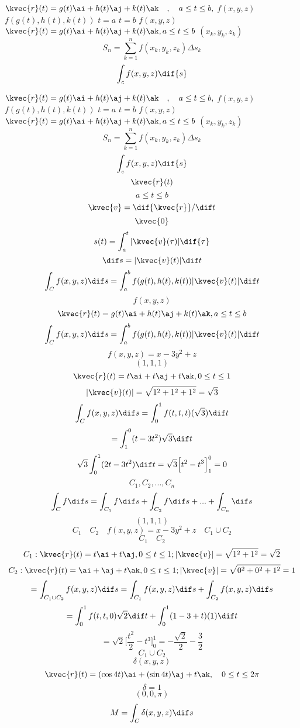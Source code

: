 

\( \kvec{r}(t)=g(t)\ai + h(t)\aj +k(t)\ak \quad , \quad a\le t \le b,            \)  
\(   f(x,y,z)          \)  
\(   f(g(t),h(t),k(t))          \)  
\(     t=a        \)  
\(   t=b          \)  
\(     f(x,y,z)        \)  
\(   \kvec{r}(t)=g(t)\ai + h(t)\aj+k(t)\ak, a\le t \le b          \)  
\(   (x_{k}, y_{k} , z_{k}  )                 \)  
 \[   S_{n}=\sum^{n}_{k=1}f(x_{k}, y_{k} , z_{k}  ) \Delta s_{k}          \]
   \[   \int_{c}f(x,y,z)\dif{s}           \]

\(             \)             \[              \]
\( \kvec{r}(t)=g(t)\ai + h(t)\aj +k(t)\ak \quad , \quad a\le t \le b,            \)  
\(   f(x,y,z)          \)  
\(   f(g(t),h(t),k(t))          \)  
\(     t=a        \)  
\(   t=b          \)  
\(     f(x,y,z)        \)  
\(   \kvec{r}(t)=g(t)\ai + h(t)\aj+k(t)\ak, a\le t \le b          \)  
\(   (x_{k}, y_{k} , z_{k}  )                 \)  
 \[   S_{n}=\sum^{n}_{k=1}f(x_{k}, y_{k} , z_{k}  ) \Delta s_{k}          \]
   \[   \int_{c}f(x,y,z)\dif{s}           \]
\[\kvec{r}(t)\]
\[a\le t\le b\]
\[\kvec{v} = \dif{\kvec{r}}/ \dif t\]
\[\kvec{0}\]
\[s(t) = \int_{a}^{t}|\kvec{v}(\tau )| \dif{\tau }\]
\[\dif s = |\kvec{v}(t)|\dif t\]
\[\int_{C}f(x,y,z)\dif s =\int_{a}^{b}f(g(t),h(t),k(t))|\kvec{v}(t)|\dif t\]
\[f(x,y,z)\]
\[\kvec{r}(t)=g(t)\ai + h(t)\aj + k(t)\ak, a\le t\le b\]
\[\int_{C}f(x,y,z)\dif s = \int_{a}^{b}f(g(t),h(t),k(t))|\kvec{v}(t)|\dif t\]
\[f(x,y,z)= x-3y^2 + z\]
\[(1,1,1)\]
\[\kvec{r}(t)=t\ai + t\aj + t\ak, 0\le t\le 1\]
\[|\kvec{v}(t)| = \sqrt{1^2 + 1^2 + 1^2} = \sqrt{3}\]
\[\int_{C}f(x,y,z)\dif s = \int_{0}^{1}f(t,t,t)(\sqrt{3})\dif t\]
\[=\int_{1}^{0}(t-3t^2)\sqrt{3}\dif t\]
\[\sqrt{3}\int_{0}^{1}(2t-3t^2)\dif t = \sqrt{3}\Big[t^2 -t^3\Big]_{1}^{0} =0\]
\[C_1,C_2,...,C_n\]
\[\int_{C}f\dif s = \int_{C_1}f\dif s + \int_{C_2}f\dif s +...+\int_{C_n}\dif s\]
\[(1,1,1)\]
\[C_1\quad C_2\quad f(x,y,z)=x-3y^2 +z\quad C_1\cup C_2\]
\[C_1\quad C_2\]
\[C_1: \kvec{r}(t)=t\ai +t\aj, 0\le t\le 1; |\kvec{v}|=\sqrt{1^2+1^2} =\sqrt{2}\]
\[C_2: \kvec{r}(t)=\ai + \aj + t\ak, 0\le t\le 1; |\kvec{v}|=\sqrt{0^2 + 0^2 + 1^2} =1\]
\[=\int_{C_1 \cup C_2}f(x,y,z)\dif s = \int_{C_1}f(x,y,z)\dif s + \int_{C_2}f(x,y,z)\dif s\]
\[=\int_{0}^{1}f(t,t,0)\sqrt{2}\dif t + \int_{0}^{1}(1-3+t)(1)\dif t\]
\[=\sqrt{2}\Big[\frac{t^2}{2} - t^3\Big]_0^1 = -\frac{\sqrt{2}}{2} -\frac{3}{2}\]
\[C_1\cup C_2\]
\[\delta(x,y,z)\]
\[\kvec{r}(t)=(\cos {4t})\ai + (\sin {4t})\aj + t\ak,\quad 0\le t\le 2\pi\]
\[\delta = 1\]
\[(0,0,\pi)\]
\[M = \int_{C}\delta(x,y,z)\dif s\]
